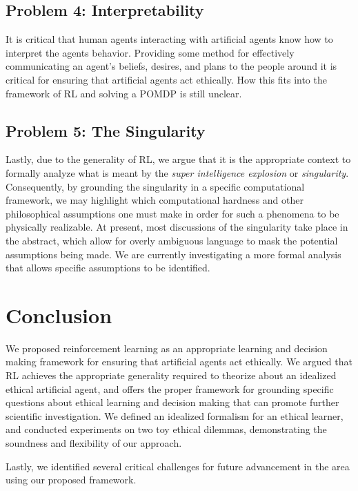 \documentclass[11pt]{article}
\begin{document}
\subsection{Problem 4: Interpretability} It is critical that human agents interacting with artificial agents know how to interpret the agents behavior. Providing some method for effectively communicating an agent's beliefs, desires, and plans to the people around it is critical for ensuring that artificial agents act ethically. How this fits into the framework of RL and solving a POMDP is still unclear.

\subsection{Problem 5: The Singularity} Lastly, due to the generality of RL, we argue that it is the appropriate context to formally analyze what is meant by the {\it super intelligence explosion} or {\it singularity}. Consequently, by grounding the singularity in a specific computational framework, we may highlight which computational hardness and other philosophical assumptions one must make in order for such a phenomena to be physically realizable. At present, most discussions of the singularity take place in the abstract, which allow for overly ambiguous language to mask the potential assumptions being made. We are currently investigating a more formal analysis that allows specific assumptions to be identified.


\section{Conclusion}

We proposed reinforcement learning as an appropriate learning and decision making framework for ensuring that artificial agents act ethically. We argued that RL achieves the appropriate generality required to theorize about an idealized ethical artificial agent, and offers the proper framework for grounding specific questions about ethical learning and decision making that can promote further scientific investigation. We defined an idealized formalism for an ethical learner, and conducted experiments on two toy ethical dilemmas, demonstrating the soundness and flexibility of our approach.

Lastly, we identified several critical challenges for future advancement in the area using our proposed framework.



\end{document}
